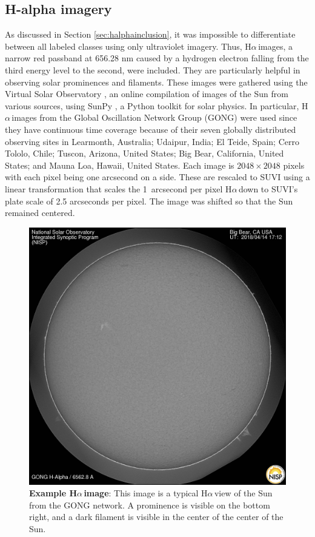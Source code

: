 \documentclass[twoside]{report}
\newcommand{\halpha}{H$\alpha$\,}
\begin{document}
\subsection{H-alpha imagery} 
As discussed in Section \ref{sec:halphainclusion}, it was impossible to differentiate between all labeled classes using only ultraviolet imagery. Thus, \halpha images, a narrow red passband at 656.28 nm caused by a hydrogen electron falling from the third energy level to the second, were included. They are particularly helpful in observing solar prominences and filaments. These images were gathered using the Virtual Solar Observatory \cite{vso}, an online compilation of images of the Sun from various sources, using SunPy \cite{sunpy, sunpyweb}, a Python toolkit for solar physics. In particular, \halpha images from the Global Oscillation Network Group (GONG) were used since they have continuous time coverage because of their seven globally distributed observing sites in Learmonth, Australia; Udaipur, India; El Teide, Spain; Cerro Tololo, Chile; Tuscon, Arizona, United States; Big Bear, California, United States; and Mauna Loa, Hawaii, United States. Each image is $2048\times2048$ pixels with each pixel being one arcsecond on a side. These are rescaled to SUVI using a linear transformation that scales the 1~arcsecond per pixel \halpha down to SUVI's plate scale of 2.5 arcseconds per pixel. The image was shifted so that the Sun remained centered.

\begin{figure}[H]
  \begin{center}
    \includegraphics[scale=0.1]{example-halpha.jpg}
    \caption{{\bf Example \halpha image}: This image is a typical \halpha view of the Sun from the GONG network. A prominence is visible on the bottom right, and a dark filament is visible in the center of the center of the Sun.}
    \label{fig:halphaimage}
 \end{center}
\end{figure}
\end{document}
